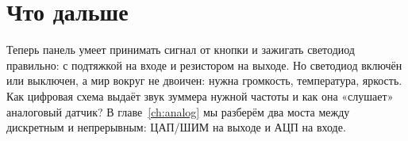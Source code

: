 \section{Что дальше}

Теперь панель умеет принимать сигнал от кнопки и зажигать светодиод правильно:
с подтяжкой на входе и резистором на выходе. Но светодиод включён или выключен,
а мир вокруг не двоичен: нужна громкость, температура, яркость. Как цифровая
схема выдаёт звук зуммера нужной частоты и как она «слушает» аналоговый
датчик? В главе~\ref{ch:analog} мы разберём два моста между дискретным и
непрерывным: ЦАП/ШИМ на выходе и АЦП на входе.

